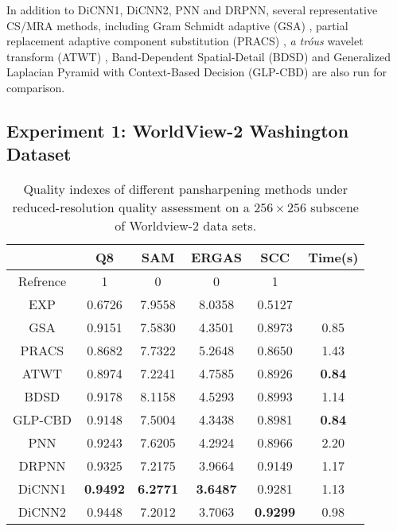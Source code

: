 \documentclass[journal]{IEEEtran}
\begin{document}
In addition to DiCNN1, DiCNN2, PNN and DRPNN, several representative CS/MRA methods, including Gram Schmidt adaptive (GSA) \cite{GS:Aiazzi2007}, partial replacement adaptive component substitution (PRACS) \cite{Choi2010A}, \textit{a tr\'ous} wavelet transform (ATWT) \cite{WDT:Vivone2014}, Band-Dependent Spatial-Detail (BDSD) \cite{Garzelli2007Optimal} and Generalized Laplacian Pyramid with Context-Based Decision (GLP-CBD) \cite{Alparone2007Comparison} are also run for comparison.

\subsection{Experiment 1: WorldView-2 Washington Dataset}
\begin{table}[htp]
\small
\caption{Quality indexes of different pansharpening methods under reduced-resolution quality assessment on a $256\times256$ subscene of Worldview-2 data sets.}
\centering
\begin{tabular}{c|ccccc}
\hline
{}&Q8&SAM& ERGAS &SCC&Time(s)\\
\hline
Refrence&1 &0 &0 &1&{}\\
\hline
EXP&0.6726 &7.9558 &8.0358 &0.5127 &{}\\
\hline
\hline
GSA&0.9151 &7.5830 &4.3501 &0.8973 &0.85\\
\hline
PRACS&0.8682 &7.7322 &5.2648 &0.8650 &1.43\\
\hline
ATWT&0.8974 &7.2241 &4.7585 &0.8926 &\textbf{0.84}\\
\hline
BDSD&0.9178 &8.1158 &4.5293 &0.8993 &1.14\\
\hline
GLP-CBD&0.9148 &7.5004 &4.3438 &0.8981 &\textbf{0.84}\\
\hline
\hline
PNN &0.9243 &7.6205 &4.2924 &0.8966&2.20\\
\hline
DRPNN &0.9325 &7.2175 &3.9664 &0.9149 &1.17\\
\hline
DiCNN1 &\textbf{0.9492} &\textbf{6.2771} &\textbf{3.6487} &0.9281 &1.13\\
\hline
DiCNN2 &0.9448 &7.2012 &3.7063 &\textbf{0.9299}&0.98\\
\hline
\end{tabular}
\label{table:qualitywv}
\end{table}
\end{document}
